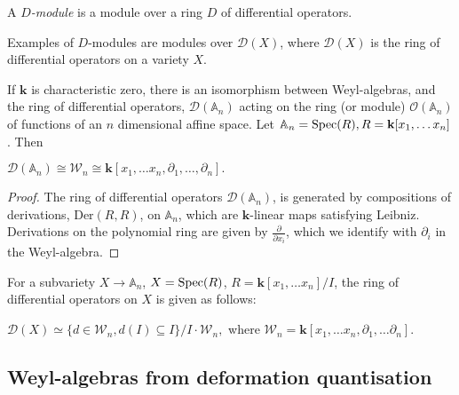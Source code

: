     \begin{defn}[\(D\)-module] A \emph{\(D\)-module} is a module over a ring \(D\) of differential operators.
    \end{defn}
    \begin{ex}
    Examples of \(D\)-modules are modules over \( \mathcal{D}(X)\), where \( \mathcal{D}(X)\) is the ring of differential operators on a variety \(X\).
    \end{ex}
    
    
    If \( \mathbf{k}\) is characteristic zero, there is an isomorphism between Weyl-algebras, and the ring of differential operators, \(\mathcal{D}( \mathbb{A}_n)\) acting on the ring (or module) \( \mathcal{O}(\mathbb{A}_n)\) of functions of an \(n\) dimensional affine space. Let \( \mathbb{A}_n = \mathrm{Spec}(R), R=\mathbf{k}[x_1, \dots x_n]\). Then
    \begin{lem}
    \(\mathcal{D}(\mathbb{A}_n) \cong \mathcal{W}_n \cong \mathbf{k}[x_1,\dots x_n,\partial_1, \dots , \partial_n].\)
    \end{lem}
    
    
    \begin{proof}
    The ring of differential operators \( \mathcal{D}(\mathbb{A}_n) \), is generated by compositions of derivations, \( \mathrm{Der}(R,R)\), on \(\mathbb{A}_n\), which are \(\mathbf{k}\)-linear maps satisfying Leibniz. Derivations on the polynomial ring are given by \( \frac{\partial}{\partial x_i}\), which we identify with \( \partial_i \) in the Weyl-algebra.
    \end{proof}
    
    For a subvariety \(X \rightarrow \mathbb{A}_n\), \(X = \mathrm{Spec}(R)\),  \(R=\mathbf{k}[x_1, \dots x_n]/I\), the ring of differential operators on \(X\) is given as follows:
    \begin{lem}
    \(  \mathcal{D}(X) \simeq \{ d \in \mathcal{W}_n, d(I) \subseteq I \}/I \cdot \mathcal{W}_n,\)  where
    \( \mathcal{W}_n=\mathbf{k}[x_1,\dots x_n, \partial_1, \dots \partial_n]\).
    \end{lem}
    
    \subsection{Weyl-algebras from deformation quantisation}
    
